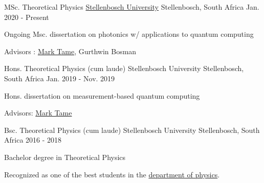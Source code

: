 

\begin{cventries}

  \cventry
    {MSc. Theoretical Physics} %
    {\href{http://www.sun.ac.za/english}{Stellenbosch University}} %
    {Stellenbosch, South Africa} %
    {Jan. 2020 - Present} %
    {
      \begin{cvitems} %
        \item {Ongoing Msc. dissertation on photonics w/ applications to quantum computing}
        \item {Advisors : \href{http://quantumnanophotonics.org/}{Mark
            Tame}, Gurthwin Bosman}
      \end{cvitems}
    }

  \cventry
    {Hons. Theoretical Physics (cum laude)} %
    {Stellenbosch University} %
    {Stellenbosch, South Africa} %
    {Jan. 2019 - Nov. 2019} %
    {
      \begin{cvitems} %
        \item {Hons. dissertation on measurement-based quantum computing}
        \item {Advisors: \href{http://quantumnanophotonics.org/}{Mark Tame}}
      \end{cvitems}
    }


  \cventry
    {Bsc. Theoretical Physics (cum laude)} %
    {Stellenbosch University} %
    {Stellenbosch, South Africa} %
    {2016 - 2018} %
    {
      \begin{cvitems} %
        \item {Bachelor degree in Theoretical Physics}
        \item {Recognized as one of the best students in the
                \href{http://www.sun.ac.za/english/faculty/science/physics}{department of
            physics}.}
      \end{cvitems}
    }


\end{cventries}
